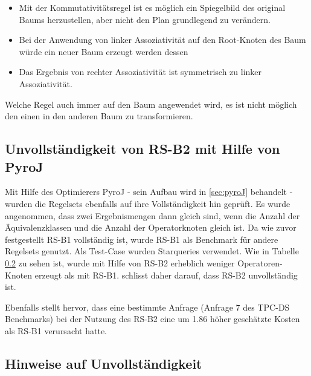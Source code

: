 \begin{itemize}
\item Mit der Kommutativitätsregel ist es möglich ein Spiegelbild des original Baums herzustellen, aber nicht den Plan grundlegend zu verändern.
\item Bei der Anwendung von linker Assoziativität auf den Root-Knoten des Baum würde ein neuer Baum erzeugt werden dessen
\item Das Ergebnis von rechter Assoziativität ist symmetrisch zu linker Assoziativität.
\end{itemize}


Welche Regel auch immer auf den Baum angewendet wird, es ist nicht möglich den einen in den anderen Baum zu transformieren.

\subsection{Unvollständigkeit von RS-B2 mit Hilfe von PyroJ}

Mit Hilfe des Optimierers PyroJ - sein Aufbau wird in \ref{sec:pyroJ} behandelt - wurden die Regelsets ebenfalls auf ihre Vollständigkeit hin geprüft. Es wurde angenommen, dass zwei Ergebnismengen dann gleich sind, wenn die Anzahl der Äquivalenzklassen und die Anzahl der Operatorknoten gleich ist. Da wie zuvor festgestellt RS-B1 vollständig ist, wurde RS-B1 als Benchmark für andere Regelsets genutzt. Als Test-Case wurden Starqueries verwendet. Wie in Tabelle \ref{} zu sehen ist, wurde mit Hilfe von RS-B2 erheblich weniger Operatoren-Knoten erzeugt als mit RS-B1. \cite{} schlisst daher darauf, dass RS-B2 unvollständig ist.

Ebenfalls stellt \cite{} hervor, dass eine bestimmte Anfrage (Anfrage 7 des TPC-DS Benchmarks) bei der Nutzung des RS-B2 eine um 1.86 höher geschätzte Kosten als RS-B1 verursacht hatte.



\subsection{Hinweise auf Unvollständigkeit}